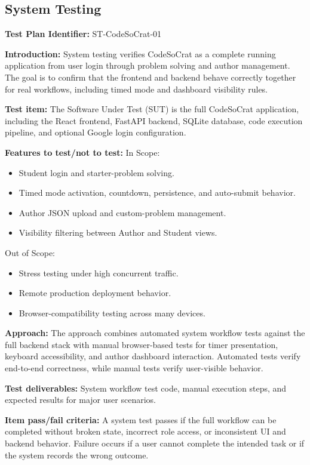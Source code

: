 \subsection{System Testing}
\textbf{Test Plan Identifier:}
ST-CodeSoCrat-01

\textbf{Introduction:}
System testing verifies CodeSoCrat as a complete running application from user login through problem solving and author management. The goal is to confirm that the frontend and backend behave correctly together for real workflows, including timed mode and dashboard visibility rules.

\textbf{Test item:}
The Software Under Test (SUT) is the full CodeSoCrat application, including the React frontend, FastAPI backend, SQLite database, code execution pipeline, and optional Google login configuration.

\textbf{Features to test/not to test:}
In Scope:
\begin{itemize}
    \item Student login and starter-problem solving.
    \item Timed mode activation, countdown, persistence, and auto-submit behavior.
    \item Author JSON upload and custom-problem management.
    \item Visibility filtering between Author and Student views.
\end{itemize}

Out of Scope:
\begin{itemize}
    \item Stress testing under high concurrent traffic.
    \item Remote production deployment behavior.
    \item Browser-compatibility testing across many devices.
\end{itemize}

\textbf{Approach:}
The approach combines automated system workflow tests against the full backend stack with manual browser-based tests for timer presentation, keyboard accessibility, and author dashboard interaction. Automated tests verify end-to-end correctness, while manual tests verify user-visible behavior.

\textbf{Test deliverables:}
System workflow test code, manual execution steps, and expected results for major user scenarios.

\textbf{Item pass/fail criteria:}
A system test passes if the full workflow can be completed without broken state, incorrect role access, or inconsistent UI and backend behavior. Failure occurs if a user cannot complete the intended task or if the system records the wrong outcome.

